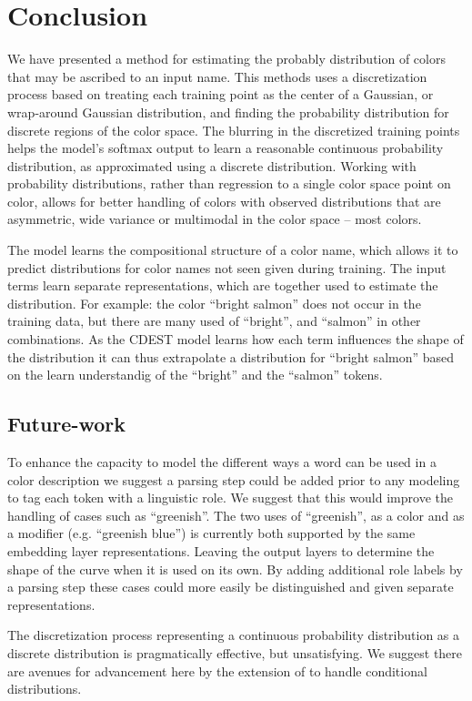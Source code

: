 \documentclass[11pt,letterpaper]{article}
\newcommand{\textcite}{\newcite}
\begin{document}
\section{Conclusion}\label{sec:conclusion}
We have presented a method for estimating the probably distribution of colors that may be ascribed to an input name.
This methods uses a discretization process based on treating each training point as the center of a Gaussian, or wrap-around Gaussian distribution, and finding the probability distribution for discrete regions of the color space.
The blurring in the discretized training points helps the model's softmax output to learn a reasonable continuous probability distribution, as approximated using a discrete distribution.
Working with probability distributions, rather than regression to a single color space point on color, allows for better handling of colors with observed distributions that are asymmetric, wide variance or multimodal in the color space -- most colors.

The model learns the compositional structure of a color name, which allows it to predict distributions for color names not seen given during training.
The input terms learn separate representations, which are together used to estimate the distribution.
For example: the color ``bright salmon'' does not occur in the training data, but there are many used of ``bright'', and ``salmon'' in other combinations.
As the CDEST model learns how each term influences the shape of the distribution it can thus extrapolate a distribution for ``bright salmon'' based on the learn understandig of the ``bright'' and the ``salmon'' tokens.


\subsection{Future-work}
To enhance the capacity to model the different ways a word can be used in a color description we suggest a parsing step could be added prior to any modeling to tag each token with a linguistic role.
We suggest that this would improve the handling of cases such as ``greenish''.
The two uses of ``greenish'', as a color and as a modifier (e.g. ``greenish blue'') is currently both supported by the same embedding layer representations.
Leaving the output layers to determine the shape of the curve when it is used on its own.
By adding additional role labels by a parsing step these cases could more easily be distinguished and given separate representations.


The discretization process representing a continuous probability distribution as a discrete distribution is pragmatically effective, but unsatisfying.
We suggest there are avenues for advancement here by the extension of \textcite{magdon1998neural} to handle conditional distributions.


\clearpage



\end{document}
